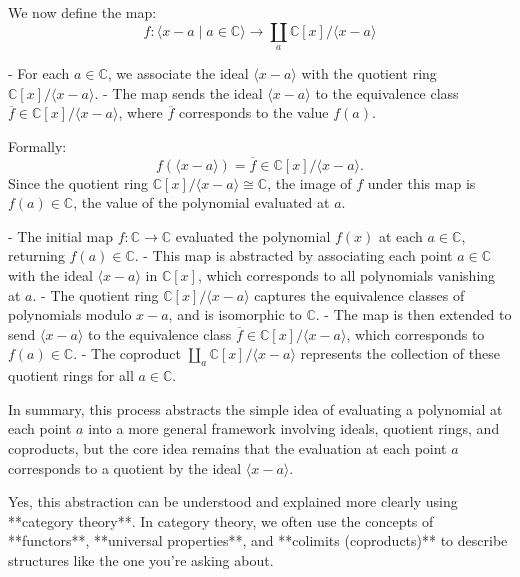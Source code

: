 \documentclass[11pt,openany]{article}
\begin{document}

We now define the map:
\[
f: \langle x - a \mid a \in \mathbb{C} \rangle \to \coprod_a \mathbb{C}[x] / \langle x - a \rangle
\]

- For each \( a \in \mathbb{C} \), we associate the ideal \( \langle x - a \rangle \) with the quotient ring \( \mathbb{C}[x] / \langle x - a \rangle \).
- The map sends the ideal \( \langle x - a \rangle \) to the equivalence class \( \overline{f} \in \mathbb{C}[x] / \langle x - a \rangle \), where \( \overline{f} \) corresponds to the value \( f(a) \).

Formally:
\[
f(\langle x - a \rangle) = \overline{f} \in \mathbb{C}[x] / \langle x - a \rangle.
\]
Since the quotient ring \( \mathbb{C}[x] / \langle x - a \rangle \cong \mathbb{C} \), the image of \( f \) under this map is \( f(a) \in \mathbb{C} \), the value of the polynomial evaluated at \( a \).


- The initial map \( f: \mathbb{C} \to \mathbb{C} \) evaluated the polynomial \( f(x) \) at each \( a \in \mathbb{C} \), returning \( f(a) \in \mathbb{C} \).
- This map is abstracted by associating each point \( a \in \mathbb{C} \) with the ideal \( \langle x - a \rangle \) in \( \mathbb{C}[x] \), which corresponds to all polynomials vanishing at \( a \).
- The quotient ring \( \mathbb{C}[x] / \langle x - a \rangle \) captures the equivalence classes of polynomials modulo \( x - a \), and is isomorphic to \( \mathbb{C} \).
- The map is then extended to send \( \langle x - a \rangle \) to the equivalence class \( \overline{f} \in \mathbb{C}[x] / \langle x - a \rangle \), which corresponds to \( f(a) \in \mathbb{C} \).
- The coproduct \( \coprod_a \mathbb{C}[x] / \langle x - a \rangle \) represents the collection of these quotient rings for all \( a \in \mathbb{C} \).

In summary, this process abstracts the simple idea of evaluating a polynomial at each point \( a \) into a more general framework involving ideals, quotient rings, and coproducts, but the core idea remains that the evaluation at each point \( a \) corresponds to a quotient by the ideal \( \langle x - a \rangle \).

\newpage

Yes, this abstraction can be understood and explained more clearly using **category theory**. In category theory, we often use the concepts of **functors**, **universal properties**, and **colimits (coproducts)** to describe structures like the one you're asking about.
\end{document}
